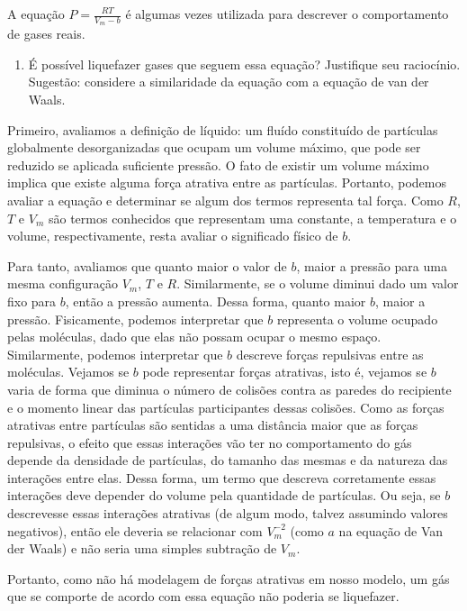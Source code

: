 \begin{xcs}
    A equação \( P = \frac{RT}{V_m - b} \) é algumas vezes utilizada para
    descrever o comportamento de gases reais. 
    \begin{enumerate}[label=\alph*.]
        \item É possível liquefazer gases que seguem essa equação? Justifique
            seu raciocínio. Sugestão: considere a similaridade da equação com a
            equação de van der Waals. 
    \end{enumerate}
\end{xcs}
\begin{rsl}
    Primeiro, avaliamos a definição de líquido: um fluído constituído de
    partículas globalmente desorganizadas que ocupam um volume máximo, que pode
    ser reduzido se aplicada suficiente pressão. O fato de existir um volume
    máximo implica que existe alguma força atrativa entre as partículas.
    Portanto, podemos avaliar a equação e determinar se algum dos termos
    representa tal força.  Como $R$, $T$ e $V_m$ são termos conhecidos que
    representam uma constante, a temperatura e o volume, respectivamente, resta
    avaliar o significado físico de $b$.

    Para tanto, avaliamos que quanto maior
    o valor de $b$, maior a pressão para uma mesma configuração $V_m$, $T$ e
    $R$. Similarmente, se o volume diminui dado um valor fixo para $b$, então a
    pressão aumenta. Dessa forma, quanto maior $b$, maior a pressão.
    Fisicamente, podemos interpretar que $b$ representa o volume ocupado pelas
    moléculas, dado que elas não possam ocupar o mesmo espaço. Similarmente,
    podemos interpretar que $b$ descreve forças repulsivas entre as moléculas.
    Vejamos se \( b \) pode representar forças atrativas, isto é, vejamos se \(
    b\) varia de forma que diminua o número de colisões contra as paredes do
    recipiente e o momento linear das partículas participantes dessas colisões.
    Como as forças atrativas entre partículas são sentidas a uma
    distância maior que as forças repulsivas, o efeito que essas interações vão
    ter no comportamento do gás depende da densidade de partículas, do tamanho
    das mesmas e da natureza das interações entre elas. Dessa forma, um termo
    que descreva corretamente essas interações deve depender do volume pela
    quantidade de partículas. Ou seja, se \( b \) descrevesse essas interações
    atrativas (de algum modo, talvez assumindo valores negativos),
    então ele deveria se relacionar com \(
    V_m^{-2}\) (como \( a \) na equação de Van der Waals)  e não seria uma
    simples subtração de \( V_m \).
    
    Portanto, como não há modelagem de forças atrativas em nosso modelo, um gás 
    que se comporte de acordo com essa equação não poderia se liquefazer.      

\end{rsl}

